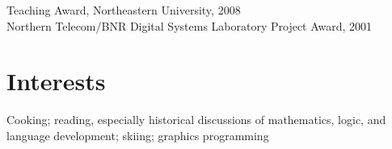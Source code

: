 \documentclass[margin,line,draft]{res}
\newcommand{\mysidestyle}{\sc}
\begin{document}
\begin{resume}
    Teaching Award, Northeastern University, 2008 \vspace{1mm}\\%
    Northern Telecom/BNR Digital Systems Laboratory Project Award, 2001


    \section{\mysidestyle Interests}

    Cooking; 
    reading, especially historical discussions of mathematics, logic, 
    and language development; 
    skiing; 
    graphics programming

\end{resume}
\end{document}
